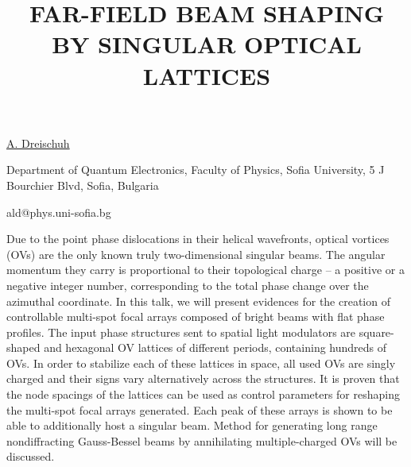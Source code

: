 \title{FAR-FIELD BEAM SHAPING BY SINGULAR OPTICAL LATTICES}

\underline{A. Dreischuh}  

{\normalsize{\vspace{-4mm}
Department of Quantum Electronics,
Faculty of Physics,
Sofia University,
5 J Bourchier Blvd, Sofia, Bulgaria



\email ald@phys.uni-sofia.bg}}

Due to the point phase dislocations in their helical wavefronts, optical vortices (OVs) are the only known truly two-dimensional singular beams. The angular momentum they carry is proportional to their topological charge -- a positive or a negative integer number, corresponding to the total phase change over the azimuthal coordinate.
In this talk, we will present evidences for the creation of controllable multi-spot focal arrays composed of bright beams with flat phase profiles. The input phase structures sent to spatial light modulators are square-shaped and hexagonal OV lattices of different periods, containing hundreds of OVs. In order to stabilize each of these lattices in space, all used OVs are singly charged and their signs vary alternatively across the structures. It is proven that the node spacings of the lattices can be used as control parameters for reshaping the multi-spot focal arrays generated. Each peak of these arrays is shown to be able to additionally host a singular beam. Method for generating long range nondiffracting Gauss-Bessel beams by annihilating multiple-charged OVs will be discussed.

\vspace{\baselineskip}